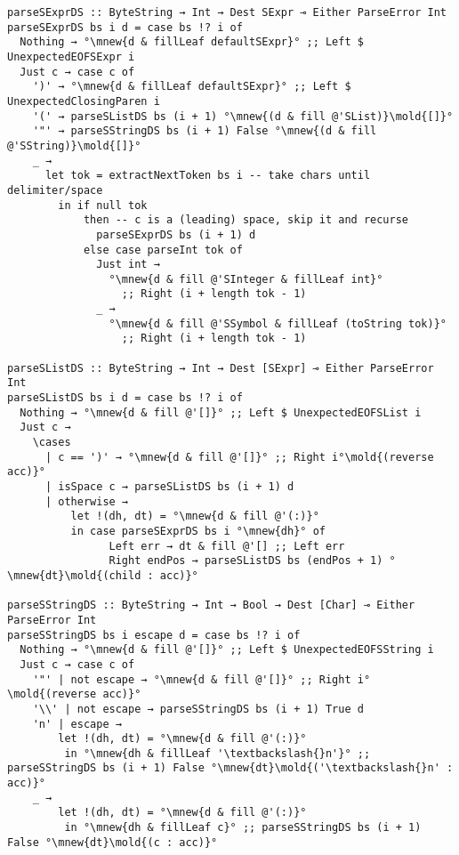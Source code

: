 \documentclass[english]{jflart}
\begin{document}
\begin{table}[H]
\small
\begin{verbatim}
parseSExprDS :: ByteString → Int → Dest SExpr ⊸ Either ParseError Int
parseSExprDS bs i d = case bs !? i of
  Nothing → °\mnew{d & fillLeaf defaultSExpr}° ;; Left $ UnexpectedEOFSExpr i
  Just c → case c of
    ')' → °\mnew{d & fillLeaf defaultSExpr}° ;; Left $ UnexpectedClosingParen i
    '(' → parseSListDS bs (i + 1) °\mnew{(d & fill @'SList)}\mold{[]}°
    '"' → parseSStringDS bs (i + 1) False °\mnew{(d & fill @'SString)}\mold{[]}°
    _ →
      let tok = extractNextToken bs i -- take chars until delimiter/space
        in if null tok
            then -- c is a (leading) space, skip it and recurse
              parseSExprDS bs (i + 1) d
            else case parseInt tok of
              Just int →
                °\mnew{d & fill @'SInteger & fillLeaf int}°
                  ;; Right (i + length tok - 1)
              _ →
                °\mnew{d & fill @'SSymbol & fillLeaf (toString tok)}°
                  ;; Right (i + length tok - 1)

parseSListDS :: ByteString → Int → Dest [SExpr] ⊸ Either ParseError Int
parseSListDS bs i d = case bs !? i of
  Nothing → °\mnew{d & fill @'[]}° ;; Left $ UnexpectedEOFSList i
  Just c →
    \cases
      | c == ')' → °\mnew{d & fill @'[]}° ;; Right i°\mold{(reverse acc)}°
      | isSpace c → parseSListDS bs (i + 1) d
      | otherwise →
          let !(dh, dt) = °\mnew{d & fill @'(:)}°
          in case parseSExprDS bs i °\mnew{dh}° of
                Left err → dt & fill @'[] ;; Left err
                Right endPos → parseSListDS bs (endPos + 1) °\mnew{dt}\mold{(child : acc)}°

parseSStringDS :: ByteString → Int → Bool → Dest [Char] ⊸ Either ParseError Int
parseSStringDS bs i escape d = case bs !? i of
  Nothing → °\mnew{d & fill @'[]}° ;; Left $ UnexpectedEOFSString i
  Just c → case c of
    '"' | not escape → °\mnew{d & fill @'[]}° ;; Right i°\mold{(reverse acc)}°
    '\\' | not escape → parseSStringDS bs (i + 1) True d
    'n' | escape →
        let !(dh, dt) = °\mnew{d & fill @'(:)}°
         in °\mnew{dh & fillLeaf '\textbackslash{}n'}° ;; parseSStringDS bs (i + 1) False °\mnew{dt}\mold{('\textbackslash{}n' : acc)}°
    _ →
        let !(dh, dt) = °\mnew{d & fill @'(:)}°
         in °\mnew{dh & fillLeaf c}° ;; parseSStringDS bs (i + 1) False °\mnew{dt}\mold{(c : acc)}°
\end{verbatim}
\caption{Implementation of S-expressions parser with destinations}
\label{table:impl-sexpr-parser-with-dest}
\end{table}
\end{document}
